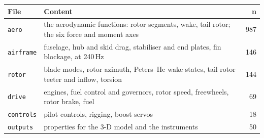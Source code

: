 \begin{tabularx}{\columnwidth}{@{}lXr@{}}
\toprule
File & Content & n \\
\midrule
\texttt{aero} & the aerodynamic functions: rotor segments, wake, tail rotor; the six force and moment axes & 987 \\
\texttt{airframe} & fuselage, hub and skid drag, stabiliser and end plates, fin blockage, at 240\,Hz & 146 \\
\texttt{rotor} & blade modes, rotor azimuth, Peters--He wake states, tail rotor teeter and inflow, torsion & 144 \\
\texttt{drive} & engines, fuel control and governors, rotor speed, freewheels, rotor brake, fuel & 69 \\
\texttt{controls} & pilot controls, rigging, boost servos & 18 \\
\texttt{outputs} & properties for the 3-D model and the instruments & 50 \\
\bottomrule
\end{tabularx}
